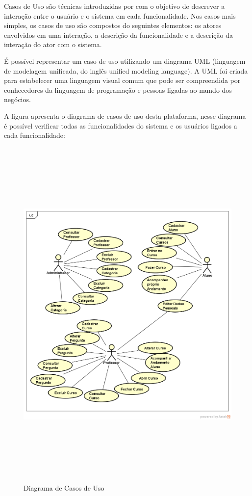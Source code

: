 Casos de Uso são técnicas introduzidas por  \citep{jacobson93} com o objetivo de descrever a interação entre o usuário e o sistema em cada funcionalidade. Nos casos mais simples, os casos de uso são compostos do seguintes elementos: os atores envolvidos em uma interação, a descrição da funcionalidade e a descrição da interação do ator com o sistema.

É possível representar um caso de uso utilizando um diagrama UML (linguagem de modelagem unificada, do inglês unified modeling language). A UML foi criada para estabelecer uma linguagem visual comum que pode ser compreendida por conhecedores da linguagem de programação e pessoas ligadas ao mundo dos negócios.

A figura  apresenta o diagrama de casos de uso desta plataforma, nesse diagrama é possível verificar todas as funcionalidades do sistema e os usuários ligados a cada funcionalidade:

\begin{figure}[htp]
\begin{center}
  \includegraphics[width=15cm, height=18cm]{images/proposta-img/Figura4-2.png}
  \caption{Diagrama de Casos de Uso}
  \label{fig:Figura4-2}
\end{center}
\end{figure}


